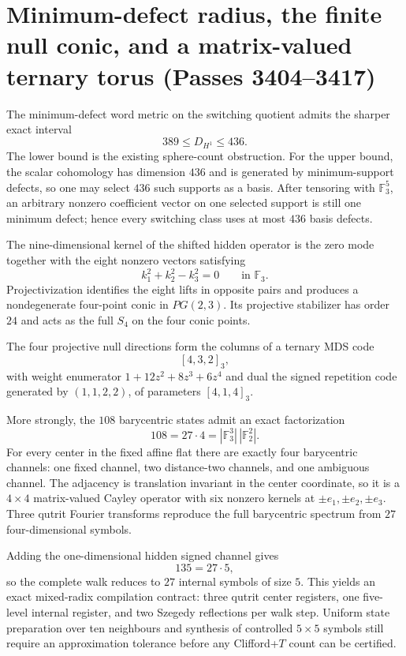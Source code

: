 \section{Minimum-defect radius, the finite null conic, and a matrix-valued ternary torus (Passes 3404--3417)}

The minimum-defect word metric on the switching quotient admits the sharper exact interval
\[
\boxed{389\leq D_{H^1}\leq436}.
\]
The lower bound is the existing sphere-count obstruction.  For the upper bound, the scalar cohomology has dimension $436$ and is generated by minimum-support defects, so one may select $436$ such supports as a basis.  After tensoring with $\mathbb F_3^5$, an arbitrary nonzero coefficient vector on one selected support is still one minimum defect; hence every switching class uses at most $436$ basis defects.

The nine-dimensional kernel of the shifted hidden operator is the zero mode together with the eight nonzero vectors satisfying
\[
 k_1^2+k_2^2-k_3^2=0\qquad\text{in }\mathbb F_3.
\]
Projectivization identifies the eight lifts in opposite pairs and produces a nondegenerate four-point conic in $PG(2,3)$.  Its projective stabilizer has order $24$ and acts as the full $S_4$ on the four conic points.

The four projective null directions form the columns of a ternary MDS code
\[
\boxed{[4,3,2]_3},
\]
with weight enumerator $1+12z^2+8z^3+6z^4$ and dual the signed repetition code generated by $(1,1,2,2)$, of parameters $[4,1,4]_3$.

More strongly, the $108$ barycentric states admit an exact factorization
\[
\boxed{108=27\cdot4=|\mathbb F_3^3|\,|\mathbb F_2^2|}.
\]
For every center in the fixed affine flat there are exactly four barycentric channels: one fixed channel, two distance-two channels, and one ambiguous channel.  The adjacency is translation invariant in the center coordinate, so it is a $4\times4$ matrix-valued Cayley operator with six nonzero kernels at $\pm e_1,\pm e_2,\pm e_3$.  Three qutrit Fourier transforms reproduce the full barycentric spectrum from $27$ four-dimensional symbols.

Adding the one-dimensional hidden signed channel gives
\[
\boxed{135=27\cdot5},
\]
so the complete walk reduces to $27$ internal symbols of size $5$.  This yields an exact mixed-radix compilation contract: three qutrit center registers, one five-level internal register, and two Szegedy reflections per walk step.  Uniform state preparation over ten neighbours and synthesis of controlled $5\times5$ symbols still require an approximation tolerance before any Clifford+$T$ count can be certified.

